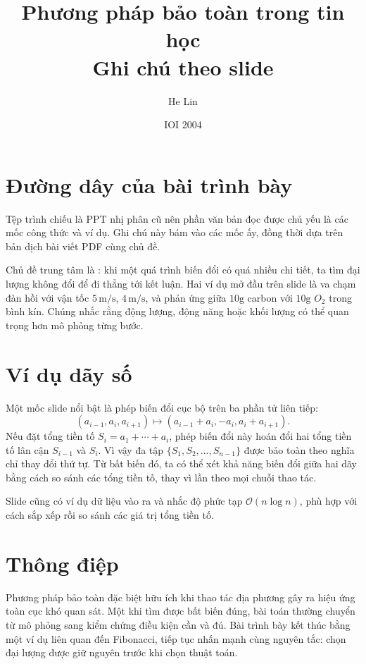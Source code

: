 \documentclass[11pt]{article}
\title{Phương pháp bảo toàn trong tin học\\{\large Ghi chú theo slide}}
\author{He Lin}
\date{IOI 2004}
\newcommand{\Oh}{\mathcal{O}}
\begin{document}
\maketitle


\section{Đường dây của bài trình bày}

Tệp trình chiếu là PPT nhị phân cũ nên phần văn bản đọc được chủ yếu là các
mốc công thức và ví dụ. Ghi chú này bám vào các mốc ấy, đồng thời dựa trên
bản dịch bài viết PDF cùng chủ đề.

Chủ đề trung tâm là : khi một quá trình biến đổi có quá nhiều
chi tiết, ta tìm đại lượng không đổi để đi thẳng tới kết luận. Hai ví dụ mở
đầu trên slide là va chạm đàn hồi với vận tốc \(5\,\mathrm{m/s}\),
\(4\,\mathrm{m/s}\), và phản ứng giữa \(10\mathrm{g}\) carbon với
\(10\mathrm{g}\) \(O_2\) trong bình kín. Chúng nhắc rằng động lượng, động
năng hoặc khối lượng có thể quan trọng hơn mô phỏng từng bước.

\section{Ví dụ dãy số}

Một mốc slide nổi bật là phép biến đổi cục bộ trên ba phần tử liên tiếp:
\[
  (a_{i-1},a_i,a_{i+1})
  \longmapsto
  (a_{i-1}+a_i,-a_i,a_i+a_{i+1}).
\]
Nếu đặt tổng tiền tố \(S_i=a_1+\cdots+a_i\), phép biến đổi này hoán đổi hai
tổng tiền tố lân cận \(S_{i-1}\) và \(S_i\). Vì vậy đa tập
\(\{S_1,S_2,\ldots,S_{n-1}\}\) được bảo toàn theo nghĩa chỉ thay đổi thứ tự.
Từ bất biến đó, ta có thể xét khả năng biến đổi giữa hai dãy bằng cách so
sánh các tổng tiền tố, thay vì lần theo mọi chuỗi thao tác.

Slide cũng có ví dụ dữ liệu vào ra và nhắc độ phức tạp \(\Oh(n\log n)\), phù
hợp với cách sắp xếp rồi so sánh các giá trị tổng tiền tố.

\section{Thông điệp}

Phương pháp bảo toàn đặc biệt hữu ích khi thao tác địa phương gây ra hiệu ứng
toàn cục khó quan sát. Một khi tìm được bất biến đúng, bài toán thường chuyển
từ mô phỏng sang kiểm chứng điều kiện cần và đủ. Bài trình bày kết thúc bằng
một ví dụ liên quan đến Fibonacci, tiếp tục nhấn mạnh cùng nguyên tắc: chọn
đại lượng được giữ nguyên trước khi chọn thuật toán.
\end{document}
